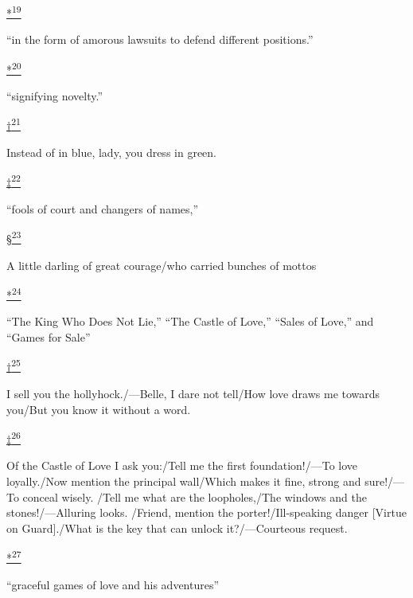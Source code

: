 \protect\hypertarget{23_NOTES.xhtmlux5cux23id_3138}{\protect\hyperlink{11_Chapter_Four__THE_FORMS_OF_LOVE.xhtmlux5cux23id_3137}{*\textsuperscript{19}}}
``in the form of amorous lawsuits to defend different positions.''

\protect\hypertarget{23_NOTES.xhtmlux5cux23id_3140}{\protect\hyperlink{11_Chapter_Four__THE_FORMS_OF_LOVE.xhtmlux5cux23id_3139}{*\textsuperscript{20}}}
``signifying novelty.''

\protect\hypertarget{23_NOTES.xhtmlux5cux23id_3142}{\protect\hyperlink{11_Chapter_Four__THE_FORMS_OF_LOVE.xhtmlux5cux23id_3141}{†\textsuperscript{21}}}
Instead of in blue, lady, you dress in green.

\protect\hypertarget{23_NOTES.xhtmlux5cux23id_3144}{\protect\hyperlink{11_Chapter_Four__THE_FORMS_OF_LOVE.xhtmlux5cux23id_3143}{‡\textsuperscript{22}}}
``fools of court and changers of names,''

\protect\hypertarget{23_NOTES.xhtmlux5cux23id_3146}{\protect\hyperlink{11_Chapter_Four__THE_FORMS_OF_LOVE.xhtmlux5cux23id_3145}{§\textsuperscript{23}}}
A little darling of great courage/who carried bunches of mottos

\protect\hypertarget{23_NOTES.xhtmlux5cux23id_3148}{\protect\hyperlink{11_Chapter_Four__THE_FORMS_OF_LOVE.xhtmlux5cux23id_3147}{*\textsuperscript{24}}}
``The King Who Does Not Lie,'' ``The Castle of Love,'' ``Sales of
Love,'' and ``Games for Sale''

\protect\hypertarget{23_NOTES.xhtmlux5cux23id_3150}{\protect\hyperlink{11_Chapter_Four__THE_FORMS_OF_LOVE.xhtmlux5cux23id_3149}{†\textsuperscript{25}}}
I sell you the hollyhock./---Belle, I dare not tell/How love draws me
towards you/But you know it without a word.

\protect\hypertarget{23_NOTES.xhtmlux5cux23id_3152}{\protect\hyperlink{11_Chapter_Four__THE_FORMS_OF_LOVE.xhtmlux5cux23id_3151}{‡\textsuperscript{26}}}
Of the Castle of Love I ask you:/Tell me the first foundation!/---To
love loyally./Now mention the principal wall/Which makes it fine, strong
and sure!/---To conceal wisely. /Tell me what are the loopholes,/The
windows and the stones!/---Alluring looks. /Friend, mention the
porter!/Ill-speaking danger {[}Virtue on Guard{]}./What is the key that
can unlock it?/---Courteous request.

\protect\hypertarget{23_NOTES.xhtmlux5cux23id_3154}{\protect\hyperlink{11_Chapter_Four__THE_FORMS_OF_LOVE.xhtmlux5cux23id_3153}{*\textsuperscript{27}}}
``graceful games of love and his adventures''

